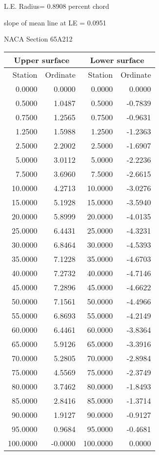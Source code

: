 \documentclass[11pt]{book}
\begin{document}
L.E. Radius=  0.8908 percent chord


 slope of mean line at LE =  0.0951
 \newpage
  \label{s65A212}
 \begin{Large}
 NACA Section 65A212
 \end{Large}
  
 \vspace{8mm}
 \begin{tabular}{|r|r|r|r|} \hline 
 \multicolumn{2}{|c|}{Upper surface} & \multicolumn{2}{|c|}{Lower surface} \\
 \hline
 Station & Ordinate & Station & Ordinate \\
 \hline
0.0000 & 0.0000 & 0.0000 & 0.0000 \\
0.5000 & 1.0487 & 0.5000 & -0.7839 \\
0.7500 & 1.2565 & 0.7500 & -0.9631 \\
1.2500 & 1.5988 & 1.2500 & -1.2363 \\
2.5000 & 2.2002 & 2.5000 & -1.6907 \\
5.0000 & 3.0112 & 5.0000 & -2.2236 \\
7.5000 & 3.6960 & 7.5000 & -2.6615 \\
10.0000 & 4.2713 & 10.0000 & -3.0276 \\
15.0000 & 5.1928 & 15.0000 & -3.5940 \\
20.0000 & 5.8999 & 20.0000 & -4.0135 \\
25.0000 & 6.4431 & 25.0000 & -4.3231 \\
30.0000 & 6.8464 & 30.0000 & -4.5393 \\
35.0000 & 7.1228 & 35.0000 & -4.6703 \\
40.0000 & 7.2732 & 40.0000 & -4.7146 \\
45.0000 & 7.2896 & 45.0000 & -4.6622 \\
50.0000 & 7.1561 & 50.0000 & -4.4966 \\
55.0000 & 6.8693 & 55.0000 & -4.2149 \\
60.0000 & 6.4461 & 60.0000 & -3.8364 \\
65.0000 & 5.9126 & 65.0000 & -3.3916 \\
70.0000 & 5.2805 & 70.0000 & -2.8984 \\
75.0000 & 4.5569 & 75.0000 & -2.3749 \\
80.0000 & 3.7462 & 80.0000 & -1.8493 \\
85.0000 & 2.8416 & 85.0000 & -1.3714 \\
90.0000 & 1.9127 & 90.0000 & -0.9127 \\
95.0000 & 0.9684 & 95.0000 & -0.4681 \\
100.0000 & -0.0000 & 100.0000 & 0.0000 \\
 \hline 
 \end{tabular}
\end{document}

